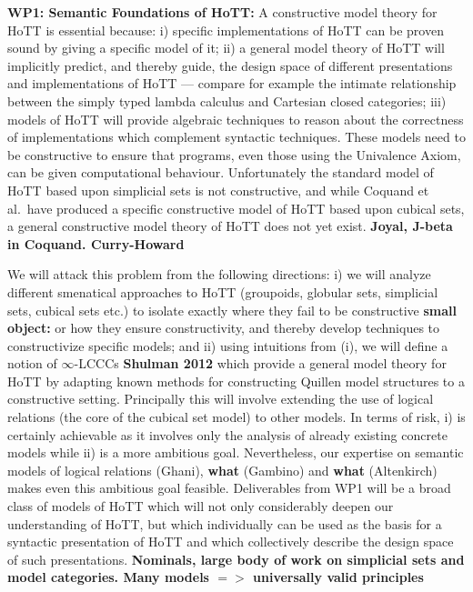 \documentclass[a4paper,11pt]{article}
\begin{document}
{\bf WP1: Semantic Foundations of HoTT:} 
A constructive model theory for HoTT is essential because: i)
specific implementations of HoTT can be proven sound by giving a specific
model of it; ii) 
a general model theory of HoTT will implicitly predict, and thereby
guide, the design space of different presentations and implementations
of HoTT --- compare for example the intimate relationship between the
simply typed lambda calculus and Cartesian closed categories; iii)
models of HoTT will provide algebraic techniques to reason about the
correctness of implementations which complement syntactic
techniques. These models need to be constructive to ensure that
programs, even those using the Univalence Axiom, can be given
computational behaviour. Unfortunately the standard model of HoTT
based upon simplicial sets is not constructive, and while Coquand et
al.\ have produced a specific constructive model of HoTT based upon
cubical sets, a general constructive model theory of HoTT does not yet
exist. {\bf Joyal, J-beta in Coquand. Curry-Howard}

We will attack this problem from the following directions: i) we will
analyze different smenatical approaches to HoTT (groupoids, globular sets, simplicial sets,
cubical sets etc.) 
to isolate exactly where they fail to be
constructive {\bf small object:} or how they ensure constructivity,
and thereby develop techniques to constructivize specific models; and
ii) using intuitions from (i), we will define a notion of
$\infty$-LCCCs {\bf Shulman 2012} which provide a general model theory for HoTT 
by adapting known methods for
constructing Quillen model structures to a constructive setting.  
Principally this will involve extending the use of logical relations
(the core of the cubical set model) to other models.  In terms of
risk, i) is certainly achievable as it involves only the analysis of
already existing concrete models while ii) is a more ambitious
goal. Nevertheless, our expertise on semantic models of logical
relations (Ghani), {\bf what} (Gambino) and {\bf what} (Altenkirch)
makes even this ambitious goal feasible. Deliverables from WP1 will be
a broad class of models of HoTT which will not only considerably
deepen our understanding of HoTT, but which individually can be used
as the basis for a syntactic presentation of HoTT and which
collectively describe the design space of such presentations.  {\bf
  Nominals, large body of work on simplicial sets and model
  categories. Many models $=>$ universally valid principles}
\end{document}
